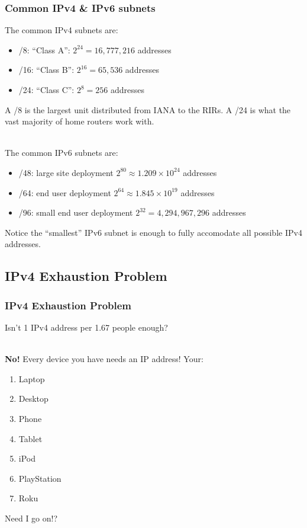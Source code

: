 \documentclass[aspectratio=169]{beamer}
\begin{document}
\begin{frame}
\frametitle{Common IPv4 \& IPv6 subnets}
The common IPv4 subnets are:
\begin{itemize}
	\item /8: ``Class A'': $2^{24} = 16,777,216$ addresses
	\item /16: ``Class B'': $2^{16} = 65,536$ addresses
	\item /24: ``Class C'': $2^{8} = 256$ addresses
\end{itemize}
A /8 is the largest unit distributed from IANA to the RIRs. A /24 is what the vast majority of home routers work with.

\pause
\mbox{}\\
The common IPv6 subnets are:
\begin{itemize}
	\item /48: large site deployment $2^{80} \approx 1.209 \times 10^{24}$ addresses
	\item /64: end user deployment $2^{64} \approx 1.845 \times 10^{19}$ addresses
	\item /96: small end user deployment $2^{32} = 4,294,967,296$ addresses
\end{itemize}
Notice the ``smallest'' IPv6 subnet is enough to fully accomodate all possible IPv4 addresses.
\end{frame}

\subsection{IPv4 Exhaustion Problem}
\begin{frame}
\frametitle{IPv4 Exhaustion Problem}
Isn't 1 IPv4 address per 1.67 people enough?

\pause
\mbox{}\\
\textbf{No!} Every device you have needs an IP address! Your:
\begin{enumerate}
	\item Laptop
	\pause
	\item Desktop
	\pause
	\item Phone
	\pause
	\item Tablet
	\pause
	\item iPod
	\pause
	\item PlayStation
	\pause
	\item Roku
	\pause
\end{enumerate}
Need I go on!?
\end{frame}
\end{document}
